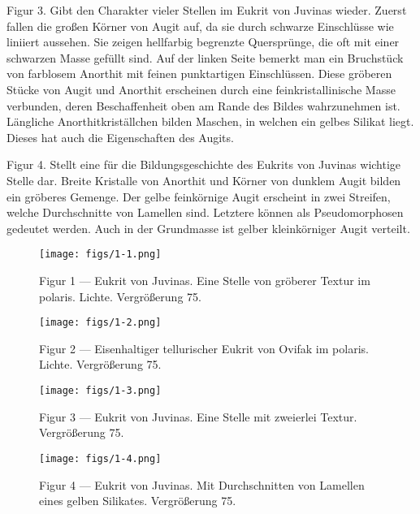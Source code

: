 \documentclass[a4paper, 11pt, oneside, polutonikogreek, german]{article}
\begin{document}
Figur 3. Gibt den Charakter vieler Stellen im Eukrit von Juvinas wieder. Zuerst fallen die großen Körner von Augit auf, da sie durch schwarze Einschlüsse wie liniiert aussehen. Sie zeigen hellfarbig begrenzte Quersprünge, die oft mit einer schwarzen Masse gefüllt sind. Auf der linken Seite bemerkt man ein Bruchstück von farblosem Anorthit mit feinen punktartigen Einschlüssen. Diese gröberen Stücke von Augit und Anorthit erscheinen durch eine feinkristallinische Masse verbunden, deren Beschaffenheit oben am Rande des Bildes wahrzunehmen ist. Längliche Anorthitkriställchen bilden Maschen, in welchen ein gelbes Silikat liegt. Dieses hat auch die Eigenschaften des Augits.

Figur 4. Stellt eine für die Bildungsgeschichte des Eukrits von Juvinas wichtige Stelle dar. Breite Kristalle von Anorthit und Körner von dunklem Augit bilden ein gröberes Gemenge. Der gelbe feinkörnige Augit erscheint in zwei Streifen, welche Durchschnitte von Lamellen sind. Letztere können als Pseudomorphosen gedeutet werden. Auch in der Grundmasse ist gelber kleinkörniger Augit verteilt.
\clearpage

\cfoot{\thepage}
\vspace*{\fill}
\begin{figure}[H]
\centering
\texttt{[image: figs/1-1.png]}
\caption{\small Figur 1 --- Eukrit von Juvinas. Eine Stelle von gröberer Textur im polaris. Lichte. Vergrößerung 75.}
\end{figure}
\vspace*{\fill}
\clearpage

\vspace*{\fill}
\begin{figure}[H]
\centering
\texttt{[image: figs/1-2.png]}
\caption{\small Figur 2 --- Eisenhaltiger tellurischer Eukrit von Ovifak im polaris. Lichte. Vergrößerung 75.}
\end{figure}
\vspace*{\fill}
\clearpage

\vspace*{\fill}
\begin{figure}[H]
\centering
\texttt{[image: figs/1-3.png]}
\caption{\small Figur 3 --- Eukrit von Juvinas. Eine Stelle mit zweierlei Textur. Vergrößerung 75.}
\end{figure}
\vspace*{\fill}
\clearpage

\vspace*{\fill}
\begin{figure}[H]
\centering
\texttt{[image: figs/1-4.png]}
\caption{\small Figur 4 --- Eukrit von Juvinas. Mit Durchschnitten von Lamellen eines gelben Silikates. Vergrößerung 75.}
\end{figure}
\vspace*{\fill}
\clearpage
{}
\end{document}
